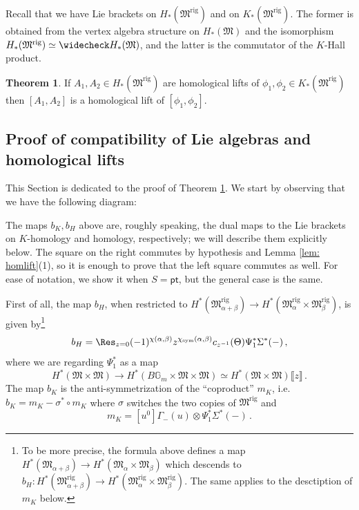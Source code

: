 \documentclass[12pt]{amsart}
\theoremstyle{definition}
\newtheorem{theorem}[definition]{Theorem}
\newcommand{\BG}{{\mathbb{G}}}
\newcommand{\1}{\mathbf 1}
\newcommand{\FM}{{\mathfrak{M}}}
\newcommand{\pt}{{\mathsf{pt}}}
\newcommand{\sym}{\text{sym}}
\newcommand{\rig}{\mathrm{rig}}
\begin{document}
Recall that we have Lie brackets on $H_\ast(\FM^\rig)$ and on $K_\ast(\FM^\rig)$. The former is obtained from the vertex algebra structure on $H_\ast(\FM)$ and the isomorphism $H_\ast(\FM^\rig)\simeq \widecheck H_\ast(\FM)$, and the latter is the commutator of the $K$-Hall product. 

\begin{theorem}\label{thm: homliftsLiealgebras}
    If $A_1, A_2\in H_\ast(\FM^\rig)$ are homological lifts of $\phi_1, \phi_2\in K_\ast(\FM^\rig)$ then $[A_1, A_2]$ is a homological lift of $[\phi_1, \phi_2]$.
\end{theorem}


\subsection{Proof of compatibility of Lie algebras and homological lifts}
\label{subsec: homliftsLie}

This Section is dedicated to the proof of Theorem \ref{thm: homliftsLiealgebras}. We start by observing that we have the following diagram:
\begin{center}
\end{center}
The maps $b_K, b_H$ above are, roughly speaking, the dual maps to the Lie brackets on $K$-homology and homology, respectively; we will describe them explicitly below. The square on the right commutes by hypothesis and Lemma \ref{lem: homlift}(1), so it is enough to prove that the left square commutes as well. For ease of notation, we show it when $S=\pt$, but the general case is the same. 

First of all, the map $b_H$, when restricted to $H^\ast(\FM_{\alpha+\beta}^\rig)\to H^\ast(\FM_{\alpha}^\rig\times \FM_{\beta}^\rig)$, is given by\footnote{To be more precise, the formula above defines a map $H^\ast(\FM_{\alpha+\beta})\to H^\ast(\FM_{\alpha}\times \FM_{\beta})$ which descends to $b_H\colon H^\ast(\FM_{\alpha+\beta}^\rig)\to H^\ast(\FM_{\alpha}^\rig\times \FM_{\beta}^\rig)$. The same applies to the desctiption of $m_K$ below.}
\[b_H=\Res_{z=0} (-1)^{\chi(\alpha, \beta)}z^{\chi_\sym(\alpha, \beta)}c_{z^{-1}}(\Theta)\Psi_1^\ast \Sigma^\ast(-)\,,\]
where we are regarding $\Psi_1^\ast$ as a map 
\[H^\ast(\FM\times \FM)\to H^\ast(B\BG_m\times \FM\times \FM)\simeq H^\ast(\FM\times \FM)\llbracket z\rrbracket\,.\]
The map $b_K$ is the anti-symmetrization of the ``coproduct'' $m_K$, i.e. $b_K=m_K-\sigma^\ast\circ m_K$ where $\sigma$ switches the two copies of $\FM^\rig$ and 
\[m_K=[u^0]\Gamma_-(u)\otimes \Psi_1^\ast \Sigma^\ast(-)\,.\]
\end{document}
